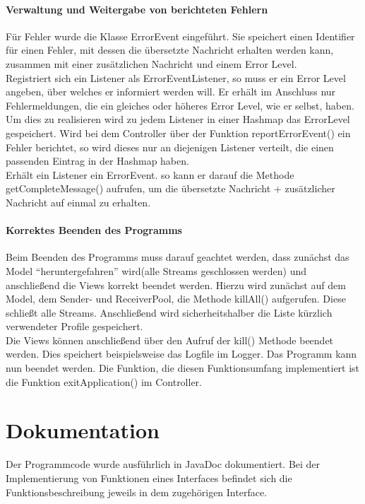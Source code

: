 \paragraph{Verwaltung und Weitergabe von berichteten Fehlern}
Für Fehler wurde die Klasse ErrorEvent eingeführt. Sie speichert einen Identifier für einen Fehler, mit dessen die übersetzte Nachricht erhalten werden kann, zusammen mit einer zusätzlichen Nachricht und einem Error Level.\\
Registriert sich ein Listener als ErrorEventListener, so muss er ein Error Level angeben, über welches er informiert werden will. Er erhält im Anschluss nur Fehlermeldungen, die ein gleiches oder höheres Error Level, wie er selbst, haben.\\
Um dies zu realisieren wird zu jedem Listener in einer Hashmap das ErrorLevel gespeichert. Wird bei dem Controller über der Funktion reportErrorEvent() ein Fehler berichtet, so wird dieses nur an diejenigen Listener verteilt, die einen passenden Eintrag in der Hashmap haben.\\
Erhält ein Listener ein ErrorEvent. so kann er darauf die Methode getCompleteMessage() aufrufen, um die übersetzte Nachricht + zusätzlicher Nachricht auf einmal zu erhalten.
\paragraph{Korrektes Beenden des Programms}
Beim Beenden des Programms muss darauf geachtet werden, dass zunächst das Model "`heruntergefahren"' wird(alle Streams geschlossen werden) und anschließend die Views korrekt beendet werden.
Hierzu wird zunächst auf dem Model, dem Sender- und ReceiverPool, die Methode killAll() aufgerufen. Diese schließt alle Streams. Anschließend wird sicherheitshalber die Liste kürzlich verwendeter Profile gespeichert.\\
Die Views können anschließend über den Aufruf der kill() Methode beendet werden. Dies speichert beispielsweise das Logfile im Logger. Das Programm kann nun beendet werden. Die Funktion, die diesen Funktionsumfang implementiert ist die Funktion exitApplication() im Controller.

\section{Dokumentation}
Der Programmcode wurde ausführlich in JavaDoc dokumentiert. Bei der Implementierung von Funktionen eines Interfaces befindet sich die Funktionsbeschreibung jeweils in dem zugehörigen Interface.\\


